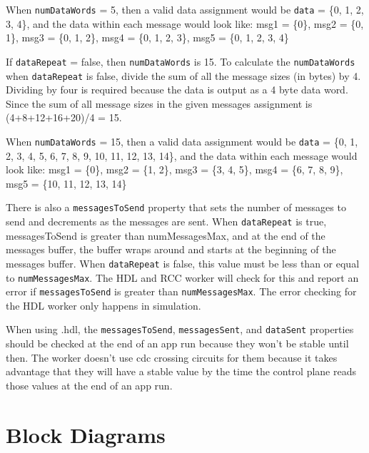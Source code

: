 \begin{flushleft}
When \texttt{numDataWords} = 5, then a valid data assignment would be \texttt{data} = \{0, 1, 2, 3, 4\}, and the data within each message would look like:
msg1 = \{0\}, msg2 = \{0, 1\}, msg3 = \{0, 1, 2\}, msg4 = \{0, 1, 2, 3\}, msg5 = \{0, 1, 2, 3, 4\}  \newline

If \texttt{dataRepeat} = false, then \texttt{numDataWords} is 15. To calculate the \texttt{numDataWords} when \texttt{dataRepeat} is false, divide the sum of all the message sizes (in bytes) by 4. Dividing by four is required because the data is output as a 4 byte data word. Since the sum of all message sizes in the given messages assignment is (4+8+12+16+20)/4 = 15. \newline

When \texttt{numDataWords} = 15, then a valid data assignment would be \texttt{data} = \{0, 1, 2, 3, 4, 5, 6, 7, 8, 9, 10, 11, 12, 13, 14\}, and the data within each message would look like: msg1 = \{0\}, msg2 = \{1, 2\}, msg3 = \{3, 4, 5\}, msg4 = \{6, 7, 8, 9\}, msg5 = \{10, 11, 12, 13, 14\}  \newline

There is also a \texttt{messagesToSend} property that sets the number of messages to send and decrements as the messages are sent. When \texttt{dataRepeat} is true, messagesToSend is greater than numMessagesMax, and at the end of the messages buffer, the buffer wraps around and starts at the beginning of the messages buffer. When \texttt{dataRepeat} is false, this value must be less than or equal to \texttt{numMessagesMax}. The HDL and RCC worker will check for this and report an error if \texttt{messagesToSend} is greater than \texttt{numMessagesMax}. The error checking for the HDL worker only happens in simulation.  \newline

When using {\comp}.hdl, the \texttt{messagesToSend}, \texttt{messagesSent},  and \texttt{dataSent} properties should be checked at the end of an app run because they won't be stable until then. The worker doesn't use cdc crossing circuits for them because it takes advantage that they will have a stable value by the time the control plane reads those values at the end of an app run.


\end{flushleft}

\section*{Block Diagrams}
